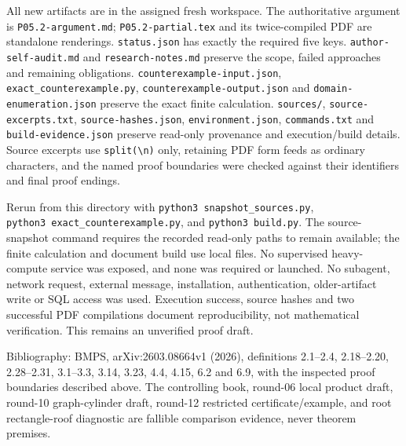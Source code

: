 \documentclass[
  10pt,
]{article}
\begin{document}
All new artifacts are in the assigned fresh workspace. The authoritative
argument is \texttt{P05.2-argument.md}; \texttt{P05.2-partial.tex} and
its twice-compiled PDF are standalone renderings. \texttt{status.json}
has exactly the required five keys. \texttt{author-self-audit.md} and
\texttt{research-notes.md} preserve the scope, failed approaches and
remaining obligations. \texttt{counterexample-input.json},
\texttt{exact\_counterexample.py}, \texttt{counterexample-output.json}
and \texttt{domain-enumeration.json} preserve the exact finite
calculation. \texttt{sources/}, \texttt{source-excerpts.txt},
\texttt{source-hashes.json}, \texttt{environment.json},
\texttt{commands.txt} and \texttt{build-evidence.json} preserve
read-only provenance and execution/build details. Source excerpts use
\texttt{split(\textquotesingle{}\textbackslash{}n\textquotesingle{})}
only, retaining PDF form feeds as ordinary characters, and the named
proof boundaries were checked against their identifiers and final proof
endings.

Rerun from this directory with \texttt{python3\ snapshot\_sources.py},
\texttt{python3\ exact\_counterexample.py}, and
\texttt{python3\ build.py}. The source-snapshot command requires the
recorded read-only paths to remain available; the finite calculation and
document build use local files. No supervised heavy-compute service was
exposed, and none was required or launched. No subagent, network
request, external message, installation, authentication, older-artifact
write or SQL access was used. Execution success, source hashes and two
successful PDF compilations document reproducibility, not mathematical
verification. This remains an unverified proof draft.

Bibliography: BMPS, arXiv:2603.08664v1 (2026), definitions 2.1--2.4,
2.18--2.20, 2.28--2.31, 3.1--3.3, 3.14, 3.23, 4.4, 4.15, 6.2 and 6.9,
with the inspected proof boundaries described above. The controlling
book, round-06 local product draft, round-10 graph-cylinder draft,
round-12 restricted certificate/example, and root rectangle-roof
diagnostic are fallible comparison evidence, never theorem premises.
\end{document}
